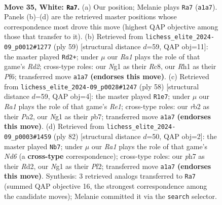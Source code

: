 \documentclass[11pt]{article}
\begin{document}
\clearpage

\begin{figure}[p]\centering
\begin{subfigure}{0.46\textwidth}\centering
\resizebox{\linewidth}{!}{%
\newchessgame
\chessboard[
  setfen={2b4k/5p1p/1r4p1/3Pn3/1p2P3/6P1/1r5P/R4KNR w - - 0 35},
  showmover=false,
  pgfstyle=straightmove, color=movearrow, markmove={a1-a7}
]}
\caption{}
\end{subfigure}\hfill
\begin{subfigure}{0.46\textwidth}\centering
\resizebox{\linewidth}{!}{%
\newchessgame
\chessboard[
  setfen={2r5/p2r2k1/5p1p/R3p3/4P1Pp/2N1RP2/P1b3K1/8 b - - 0 30},
  showmover=false,
  pgfstyle=straightmove, color=movearrow, markmove={d7-d2}
]}
\caption{}
\end{subfigure}
\\[4pt]
\begin{subfigure}{0.46\textwidth}\centering
\resizebox{\linewidth}{!}{%
\newchessgame
\chessboard[
  setfen={4R3/1p4pk/7p/2p2r2/3p1Pn1/6P1/PP5P/4R1K1 w - - 0 30},
  showmover=false,
  pgfstyle=straightmove, color=movearrow, markmove={e1-e7}
]}
\caption{}
\end{subfigure}\hfill
\begin{subfigure}{0.46\textwidth}\centering
\resizebox{\linewidth}{!}{%
\newchessgame
\chessboard[
  setfen={8/8/3Nkpp1/r3p2p/1pP3n1/1P4P1/3RKPP1/8 w - - 2 42},
  showmover=false,
  pgfstyle=straightmove, color=movearrow, markmove={d6-b7}
]}
\caption{}
\end{subfigure}
\caption{\textbf{Move 35, White: \texttt{Ra7}.} (a) Our position; Melanie plays \texttt{Ra7} (\texttt{a1a7}). Panels (b)--(d) are the retrieved master positions whose correspondence most drove this move (highest QAP objective among those that transfer to it). (b) Retrieved from \texttt{lichess\_elite\_2024-09\_p0012\#1277} (ply 59) [structural distance $d$=59, QAP obj=11]: the master played \texttt{Rd2+}; under $\mu$ our \emph{Ra1} plays the role of that game's \emph{Rd2}; cross-type roles: our \emph{N}g1 as their \emph{R}c8, our \emph{R}h1 as their \emph{P}f6; transferred move \texttt{a1a7} \textbf{(endorses this move)}. (c) Retrieved from \texttt{lichess\_elite\_2024-09\_p0028\#1247} (ply 58) [structural distance $d$=59, QAP obj=4]: the master played \texttt{R1e7}; under $\mu$ our \emph{Ra1} plays the role of that game's \emph{Re1}; cross-type roles: our \emph{r}b2 as their \emph{P}a2, our \emph{N}g1 as their \emph{p}b7; transferred move \texttt{a1a7} \textbf{(endorses this move)}. (d) Retrieved from \texttt{lichess\_elite\_2024-09\_p0003\#1459} (ply 82) [structural distance $d$=50, QAP obj=2]: the master played \texttt{Nb7}; under $\mu$ our \emph{Ra1} plays the role of that game's \emph{Nd6} (a \textbf{cross-type} correspondence); cross-type roles: our \emph{p}h7 as their \emph{R}d2, our \emph{N}g1 as their \emph{P}f2; transferred move \texttt{a1a7} \textbf{(endorses this move)}. Synthesis: 3 retrieved analogs transferred to \texttt{Ra7} (summed QAP objective 16, the strongest correspondence among the candidate moves); Melanie committed it via the \texttt{search} selector.}
\label{fig:thought-m68}
\end{figure}
\end{document}
